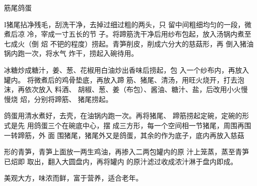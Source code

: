 \begin{recipe}[筋鞭鸽蛋]{筋尾鸽蛋}

\ingredients


\cooking

I猪尾拈净残毛，刮洗干净，去掉过细过粗的两头，只 留中间粗细均匀的一段，微煮后凉
冷，宰成一寸五长的节 子。将蹄筋洗干净后用纱布包起，放入汤锅内煮至七成火（倒 炤
不钯的程度）捞起。青笋削皮，削成六分大的慈菇形，再 倒入猪油锅内跑一次，将水气
炸干，捞起入碗待用。

冰糖炒成糖汁，姜、葱、花椒用白油炒出香味后捞起，包 入一个纱布内，再放入罐内。
将微煮后的鸡骨垫底，再放入蹄 筋、猪尾、清汤，用旺火烧开，打去泡沫，再依次放入
料酒、 胡椒、葱、姜（布包）、酱油、糖汁、盐，后改用小火慢慢烧 炤，分别将蹄筋、
猪尾捞起。

鸽蛋用清水煮好，去壳，在油锅内跑一次。再将猪尾、 蹄筋捞起定碗，定碗的形式是先
用鸽蛋三个在碗底中心，摆 成三方形，每一个空间相一节猪尾，周围再围一转蹄筋，外
面 围猪尾，猪尾外又是鸽蛋，其余的作为底子，底内再放入慈菇

形的青笋，青笋上面放一两生鸡油，再掺入二两包罐内的原 汁上笼蒸，蒸至青笋已炤即
取出，翻入大圆盘内，再将罐内 的原汁滤过收成浓汁淋于盘内即成。

\features

美观大方，味浓而鲜，富于营养，适合老年。

\end{recipe}

